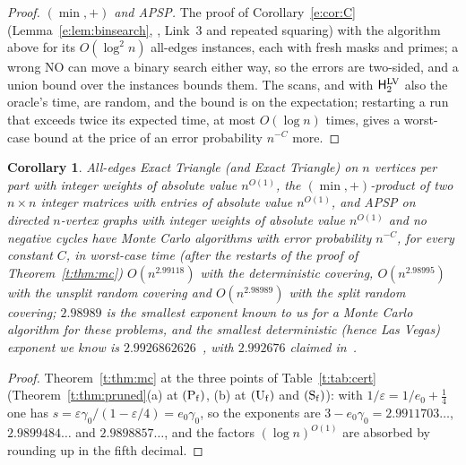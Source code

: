 \documentclass[11pt]{article}
\newtheorem{corollary}[theorem]{Corollary}
\theoremstyle{definition}
\theoremstyle{remark}
\newcommand{\Hyp}{\mathsf{H}}
\newcommand{\APSPdetNow}{2.9926862626}%
\newcommand{\APSPmcOurs}{2.98989}%
\newcommand{\APSPmcDetCov}{2.99118}%
\newcommand{\APSPmcUnsplit}{2.98995}%
\newcommand{\APSPdetEZClaim}{2.992676}%
\begin{document}
\begin{proof}
\emph{$(\min,+)$ and APSP.} The proof of Corollary~\ref{e:cor:C} (Lemma~\ref{e:lem:binsearch}, \cite[Lemma~9.2]{CVX23}, Link~3 and repeated squaring) with the algorithm above for its $O(\log^2n)$ all-edges instances, each with fresh masks and primes; a wrong NO can move a binary search either way, so the errors are two-sided, and a union bound over the instances bounds them. The scans, and with $\Hyp_2^{\rm LV}$ also the oracle's time, are random, and the bound is on the expectation; restarting a run that exceeds twice its expected time, at most $O(\log n)$ times, gives a worst-case bound at the price of an error probability $n^{-C}$ more.
\end{proof}

\begin{corollary}\label{t:cor:mcapsp}
All-edges Exact Triangle (and Exact Triangle) on $n$ vertices per part with integer weights of absolute value $n^{O(1)}$, the $(\min,+)$-product of two $n\times n$ integer matrices with entries of absolute value $n^{O(1)}$, and APSP on directed $n$-vertex graphs with integer weights of absolute value $n^{O(1)}$ and no negative cycles have Monte Carlo algorithms with error probability $n^{-C}$, for every constant $C$, in worst-case time (after the restarts of the proof of Theorem~\ref{t:thm:mc}) $O(n^{\APSPmcDetCov})$ with the deterministic covering, $O(n^{\APSPmcUnsplit})$ with the unsplit random covering and $O(n^{\APSPmcOurs})$ with the split random covering; $\APSPmcOurs$ is the smallest exponent known to us for a Monte Carlo algorithm for these problems, and the smallest deterministic (hence Las Vegas) exponent we know is $\APSPdetNow$~\cite{Shr26}, with $\APSPdetEZClaim$ claimed in~\cite[v2, footnote~1]{EZ26}.
\end{corollary}

\begin{proof}
Theorem~\ref{t:thm:mc} at the three points of Table~\ref{t:tab:cert} (Theorem~\ref{t:thm:pruned}(a) at $(\mathrm P_{\rm f})$, (b) at $(\mathrm U_{\rm f})$ and $(\mathrm S_{\rm f})$): with $1/\varepsilon=1/e_0+\frac14$ one has $s=\varepsilon\gamma_0/(1-\varepsilon/4)=e_0\gamma_0$, so the exponents are $3-e_0\gamma_0=2.9911703\ldots$, $2.9899484\ldots$ and $2.9898857\ldots$, and the factors $(\log n)^{O(1)}$ are absorbed by rounding up in the fifth decimal.
\end{proof}
\end{document}
